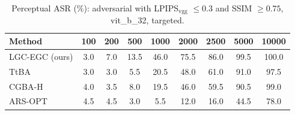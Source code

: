 \begin{table}[t]
\centering\footnotesize
\caption{Perceptual ASR (\%): adversarial with LPIPS$_{\mathrm{vgg}}$ $\le 0.3$ and SSIM $\ge 0.75$, vit\_b\_32, targeted.}
\begin{tabular}{lcccccccc}
\toprule
Method & 100 & 200 & 500 & 1000 & 2000 & 2500 & 5000 & 10000 \\
\midrule
LGC-EGC (ours) & 3.0 & 7.0 & 13.5 & 46.0 & 75.5 & 86.0 & 99.5 & 100.0 \\
TtBA & 3.0 & 3.0 & 5.5 & 20.5 & 48.0 & 61.0 & 91.0 & 97.5 \\
CGBA-H & 4.0 & 3.5 & 8.0 & 19.5 & 46.0 & 59.5 & 90.5 & 99.0 \\
ARS-OPT & 4.5 & 4.5 & 3.0 & 5.5 & 12.0 & 16.0 & 44.5 & 78.0 \\
\bottomrule
\end{tabular}
\end{table}
